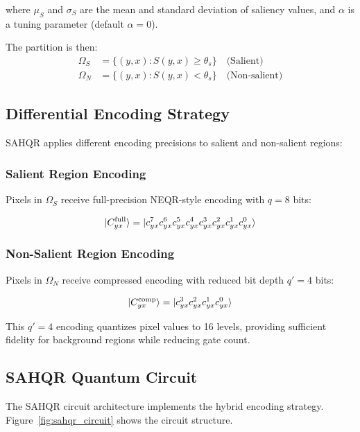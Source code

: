 \documentclass[pdflatex,sn-mathphys-num,Numbered]{sn-jnl}
\theoremstyle{thmstyleone}
\theoremstyle{thmstyletwo}
\theoremstyle{thmstylethree}
\begin{document}
where $\mu_S$ and $\sigma_S$ are the mean and standard deviation of saliency values, and $\alpha$ is a tuning parameter (default $\alpha = 0$).

The partition is then:
\begin{align}
\Omega_S &= \{(y, x) : S(y, x) \geq \theta_s\} \quad \text{(Salient)} \\
\Omega_N &= \{(y, x) : S(y, x) < \theta_s\} \quad \text{(Non-salient)}
\end{align}

\subsection{Differential Encoding Strategy}

SAHQR applies different encoding precisions to salient and non-salient regions:

\subsubsection{Salient Region Encoding}

Pixels in $\Omega_S$ receive full-precision NEQR-style encoding with $q = 8$ bits:

\begin{equation}
\ket{C_{yx}^{\text{full}}} = \ket{c^7_{yx} c^6_{yx} c^5_{yx} c^4_{yx} c^3_{yx} c^2_{yx} c^1_{yx} c^0_{yx}}
\label{eq:full_encoding}
\end{equation}

\subsubsection{Non-Salient Region Encoding}

Pixels in $\Omega_N$ receive compressed encoding with reduced bit depth $q' = 4$ bits:

\begin{equation}
\ket{C_{yx}^{\text{comp}}} = \ket{c^3_{yx} c^2_{yx} c^1_{yx} c^0_{yx}}
\label{eq:comp_encoding}
\end{equation}

This $q' = 4$ encoding quantizes pixel values to 16 levels, providing sufficient fidelity for background regions while reducing gate count.

\subsection{SAHQR Quantum Circuit}

The SAHQR circuit architecture implements the hybrid encoding strategy. Figure~\ref{fig:sahqr_circuit} shows the circuit structure.
\end{document}

